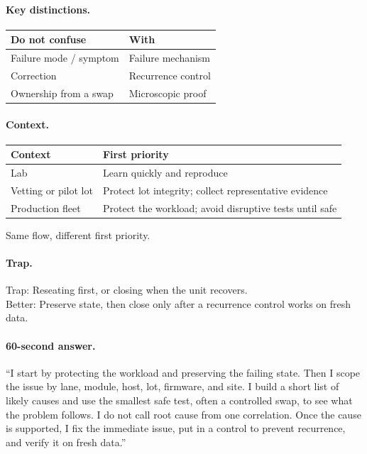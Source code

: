 \paragraph{Key distinctions.}
\begin{center}
\footnotesize
\begin{tabular}{@{}ll@{}}
\toprule
Do not confuse & With \\
\midrule
Failure mode / symptom & Failure mechanism \\
Correction & Recurrence control \\
Ownership from a swap & Microscopic proof \\
\bottomrule
\end{tabular}
\end{center}

\paragraph{Context.}
\begin{center}
\footnotesize
\begin{tabular}{@{}ll@{}}
\toprule
Context & First priority \\
\midrule
Lab & Learn quickly and reproduce \\
Vetting or pilot lot & Protect lot integrity; collect representative evidence \\
Production fleet & Protect the workload; avoid disruptive tests until safe \\
\bottomrule
\end{tabular}
\end{center}
Same flow, different first priority.

\paragraph{Trap.}
Trap: Reseating first, or closing when the unit recovers.\\
Better: Preserve state, then close only after a recurrence control works on fresh
data.

\paragraph{60-second answer.}
``I start by protecting the workload and preserving the failing state. Then I
scope the issue by lane, module, host, lot, firmware, and site. I build a short
list of likely causes and use the smallest safe test, often a controlled swap, to
see what the problem follows. I do not call root cause from one correlation. Once
the cause is supported, I fix the immediate issue, put in a control to prevent
recurrence, and verify it on fresh data.''

